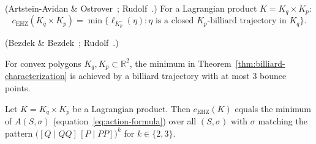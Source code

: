 \begin{theorem}%
\label{thm:billiard-characterization}
\leavevmode\newline
\textup{(Artstein-Avidan \& Ostrover~\cite{AAO2014};
Rudolf~\cite{Rudolf2022}.)}
For a Lagrangian product $K = K_q \times K_p$:
\[
  c_{\mathrm{EHZ}}(K_q \times K_p)
  = \min\bigl\{ \ell_{K_p^\circ}(\eta) :
  \eta \text{ is a closed $K_p$-billiard trajectory in } K_q \bigr\}.
\]
\end{theorem}

\begin{theorem}%
\label{thm:bounce-bound}
\leavevmode\newline
\textup{(Bezdek \& Bezdek~\cite{BezdekBezdek2009}; Rudolf~\cite{Rudolf2022}.)}

For convex polygons $K_q, K_p \subset \mathbb{R}^2$,
the minimum in Theorem~\ref{thm:billiard-characterization}
is achieved by a billiard trajectory with at most $3$ bounce points.
\end{theorem}



\begin{theorem*}
Let $K = K_q \times K_p$ be a Lagrangian product.
Then $c_{\mathrm{EHZ}}(K)$ equals the minimum of $A(S, \sigma)$
(equation~\eqref{eq:action-formula})
over all $(S, \sigma)$ with $\sigma$ matching the pattern
$\bigl([Q \mid QQ]\,[P \mid PP]\bigr)^k$
for $k \in \{2, 3\}$.
\end{theorem*}

